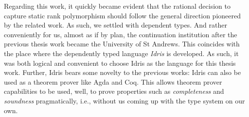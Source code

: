 \documentclass[10pt,a4paper]{article}
\begin{document}
Regarding this work, it quickly became evident that the rational decision to capture static rank polymorphism should follow the general direction pioneered by the related work. As such, we settled with dependent types. And rather conveniently for us, almost as if by plan, the continuation institution after the previous thesis work became the University of St Andrews. This coincides with the place where the dependently typed language \emph{Idris} is developed. As such, it was both logical and convenient to choose Idris as the language for this thesis work. Further, Idris bears some novelty to the previous works: Idris can also be used as a theorem prover like Agda and Coq. This allows theorem prover capabilities to be used, well, to prove properties such as \emph{completeness} and \emph{soundness} pragmatically, i.e., without us coming up with the type system on our own.






\newpage
\printbibliography
\end{document}
